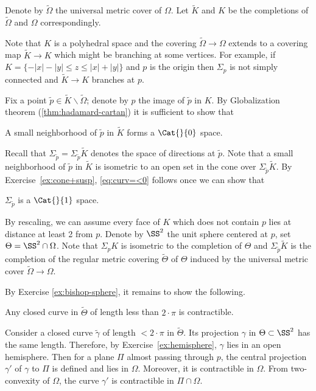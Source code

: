 Denote by $\tilde\Omega$ the universal metric cover of $\Omega$.
Let $\tilde K$ and $K$ be the completions of $\tilde\Omega$ and  $\Omega$ correspondingly.

Note that $K$ is a polyhedral space and the covering $\tilde\Omega\to\Omega$ extends to a covering map $\tilde K\to K$ which might be branching at some vertices. 
For example, if $K=\{-|x|-|y|\le z\le |x|+|y|\}$ and $p$ is the origin then $\Sigma_p$ is not simply connected and $\tilde K\to K$ branches at $p$.


Fix a point $\tilde p\in \tilde K\backslash\tilde\Omega$; 
denote by $p$ the image of $\tilde p$ in $K$.
By Globalization theorem (\ref{thm:hadamard-cartan}) it is sufficient to show that 

\begin{clm}{}\label{eq:curv=<0}
A small neighborhood of $\tilde p$ in $\tilde K$ forms a $\Cat{}{0}$ space.
\end{clm}

Recall that $\Sigma_{\tilde p}=\Sigma_{\tilde p}\tilde K$ denotes the space of directions at $\tilde p$.
Note that a small neighborhood of $\tilde p$ in $\tilde K$
is isometric to an open set in the cone over $\Sigma_{\tilde p}\tilde K$.
By Exercise~\ref{ex:cone+susp}, \ref{eq:curv=<0} follows once we can show that

\begin{clm}{}\label{eq:curv=<1}
$\Sigma_{\tilde p}$ is a $\Cat{}{1}$ space.
\end{clm}

By  rescaling, we can assume every face of $K$ which does not contain $p$ lies at distance at least 2 from $p$.
Denote by $\SS^2$ the unit sphere centered at $p$,
set $\Theta=\SS^2\cap\Omega$.
Note that $\Sigma_pK$ is isometric to the completion of $\Theta$
and $\Sigma_{\tilde p}\tilde K$ is the completion of the regular metric covering $\tilde\Theta$ of $\Theta$  induced by the universal metric cover $\tilde \Omega\to \Omega$.

By Exercise \ref{ex:bishop-sphere}, it remains to show  the following.
\begin{clm}{}
Any closed curve in $\tilde\Theta$ of length less than $2\cdot\pi$ is contractible.
\end{clm}


Consider a closed curve $\tilde \gamma$ of length $<2\cdot\pi$ in $\tilde\Theta$.
Its projection $\gamma$ in $\Theta\subset\SS^2$ has the same length.
Therefore, by Exercise~\ref{ex:hemisphere}, $\gamma$ lies in an open hemisphere.
Then for a plane $\Pi$ almost passing through $p$,
the central projection $\gamma'$ of $\gamma$ to $\Pi$ is defined and lies in $\Omega$. 
Moreover, it is contractible in $\Omega$.
From two-convexity of $\Omega$, the curve $\gamma'$ is contractible in $\Pi\cap \Omega$.


